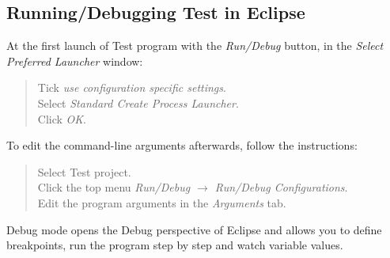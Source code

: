 \subsection{Running/Debugging \biips Test in Eclipse}
At the first launch of \biips Test program with the \emph{Run/Debug} button, in the \emph{Select Preferred Launcher} window:
\begin{quote}
Tick \emph{use configuration specific settings}.\\
Select \emph{Standard Create Process Launcher}.\\
Click \emph{OK}.
\end{quote}
To edit the command-line arguments afterwards, follow the instructions:
\begin{quote}
Select \biips Test project.\\
Click the top menu \emph{Run/Debug $\rightarrow$ Run/Debug Configurations}.\\
Edit the program arguments in the \emph{Arguments} tab.
\end{quote}
Debug mode opens the Debug perspective of Eclipse and allows you to define breakpoints, run the program step by step and watch variable values.

% 
% 


